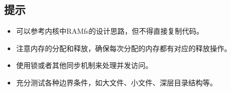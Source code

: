 \subsection{提示}

\begin{itemize}
\item 可以参考内核中RAMfs的设计思路，但不得直接复制代码。
\item 注意内存的分配和释放，确保每次分配的内存都有对应的释放操作。
\item 使用锁或者其他同步机制来处理并发访问。
\item 充分测试各种边界条件，如大文件、小文件、深层目录结构等。
\end{itemize}
